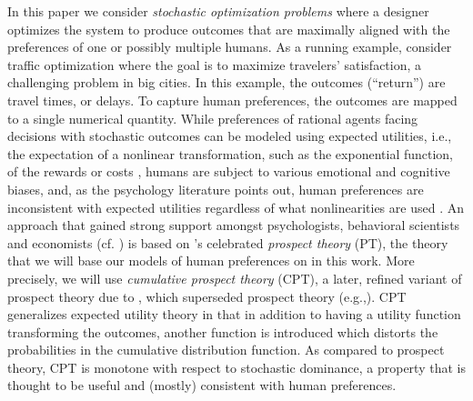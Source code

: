 In this paper we consider \emph{stochastic optimization problems}
where a designer optimizes the system 
to produce outcomes that are maximally aligned with the preferences of 
one or possibly multiple humans.
As a running example, consider traffic optimization where the goal is to maximize
travelers' satisfaction, a challenging problem 
in big cities.
In this example, the outcomes (``return'') are travel times, or delays. 
To capture human preferences, the outcomes are mapped to a single numerical quantity.
While preferences of rational agents facing decisions with stochastic outcomes can be modeled using expected utilities,
i.e., the expectation of a nonlinear transformation, such as the exponential function, of the rewards or costs
\cite{NeuMo44,fishburn1970expectedutility}, 
	humans are subject to various emotional and cognitive biases,
	and, as the psychology literature points out, human preferences 
	are inconsistent with expected utilities regardless of what nonlinearities are used
	 \cite{allais53,ellsberg61,kahneman1979prospect}.
An approach that gained 
	strong support amongst psychologists, behavioral scientists and economists (cf. \cite{starmer2000developments,quiggin2012generalized})
	is based on \cite{kahneman1979prospect}'s celebrated \emph{prospect theory} (PT),
	the theory that we will base our models of human preferences on
	 in this work.
More precisely, we will use \emph{cumulative prospect theory} (CPT),
 	a later, refined variant of prospect theory due to \cite{tversky1992advances}, 
	which superseded prospect theory (e.g.,\cite{Barberis:2012vs}).
CPT generalizes expected utility theory in that in addition to having a utility function transforming
	the outcomes, another function is introduced which distorts the probabilities in the cumulative distribution function.
As compared to prospect theory, CPT is monotone with respect to stochastic dominance, a property
	that is thought to be useful and (mostly) consistent with human preferences.
	

